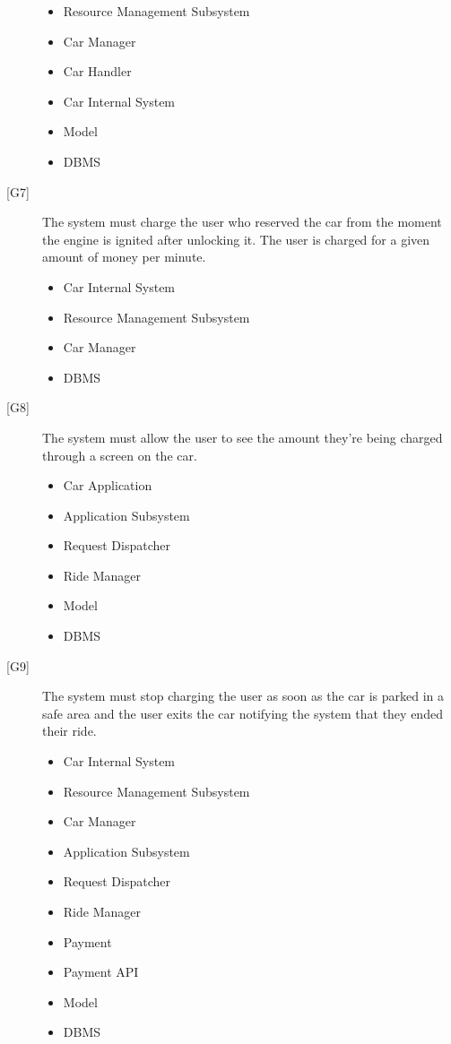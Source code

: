 \documentclass[english]{article}
\begin{document}
\begin{description}
\begin{itemize}
		\item{Resource Management Subsystem}
		\item{Car Manager}
		\item{Car Handler}
		\item{Car Internal System}
		\item{Model}
		\item{DBMS}
	\end{itemize}
	\item[{[G7]}]{The system must charge the user who reserved the car from the moment the engine is ignited after unlocking it. The user is charged for a given	amount of money per minute.}
	\begin{itemize}
		\item{Car Internal System}
		\item{Resource Management Subsystem}
		\item{Car Manager}
		\item{DBMS}
	\end{itemize}
	\item[{[G8]}]{The system must allow the user to see the amount they’re being charged through a screen on the car.}
	\begin{itemize}
		\item{Car Application}
		\item{Application Subsystem}
		\item{Request Dispatcher}
		\item{Ride Manager}
		\item{Model}
		\item{DBMS}
	\end{itemize}
	\item[{[G9]}]{The system must stop charging the user as soon as the car is parked in a safe area and the user exits the car notifying the system that they ended their ride.}
	\begin{itemize}
		\item{Car Internal System}
		\item{Resource Management Subsystem}
		\item{Car Manager}
		\item{Application Subsystem}
		\item{Request Dispatcher}
		\item{Ride Manager}
		\item{Payment}
		\item{Payment API}
		\item{Model}
		\item{DBMS}
	\end{itemize}

\end{description}
\end{document}
